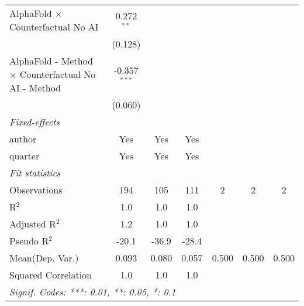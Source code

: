 \begin{tabular}{lcccccc}
   AlphaFold $\times$ Counterfactual No AI                    & 0.272$^{**}$   &               &               &     &     &   \\   
                                                              & (0.128)        &               &               &     &     &   \\   
   AlphaFold - Method $\times$ Counterfactual No AI - Method  & -0.357$^{***}$ &               &               &     &     &   \\   
                                                              & (0.060)        &               &               &     &     &   \\   
   \midrule
   \emph{Fixed-effects}\\
   author                                                     & Yes            & Yes           & Yes           &     &     & \\  
   quarter                                                    & Yes            & Yes           & Yes           &     &     & \\  
   \midrule
   \emph{Fit statistics}\\
   Observations                                               & 194            & 105           & 111           & 2   & 2   & 2\\  
   R$^2$                                                      & 1.0            & 1.0           & 1.0           &     &     & \\  
   Adjusted R$^2$                                             & 1.2            & 1.0           & 1.0           &     &     & \\  
   Pseudo R$^2$                                               & -20.1          & -36.9         & -28.4         &     &     & \\  
Mean(Dep. Var.) & 0.093 & 0.080 & 0.057 & 0.500 & 0.500 & 0.500 \\
   Squared Correlation                                        & 1.0            & 1.0           & 1.0           &     &     & \\  
   \midrule \midrule
   \multicolumn{7}{l}{\emph{Signif. Codes: ***: 0.01, **: 0.05, *: 0.1}}\\
\end{tabular}
\par\endgroup
